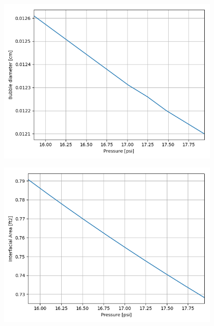 \begin{figure}[p] 
\centering
\begin{minipage}{.5\textwidth}
  \centering
  \includegraphics[width=.9\linewidth]{images/BubbleDiaPressureIncrease.png}
  \label{fig:press_increase_bubDia}
\end{minipage}%
\begin{minipage}{.5\textwidth}
  \centering
  \includegraphics[width=.9\linewidth]{images/IntAreaPressureIncrease.png}
  \label{fig:press_increase_intArea}
\end{minipage}
\end{figure}

